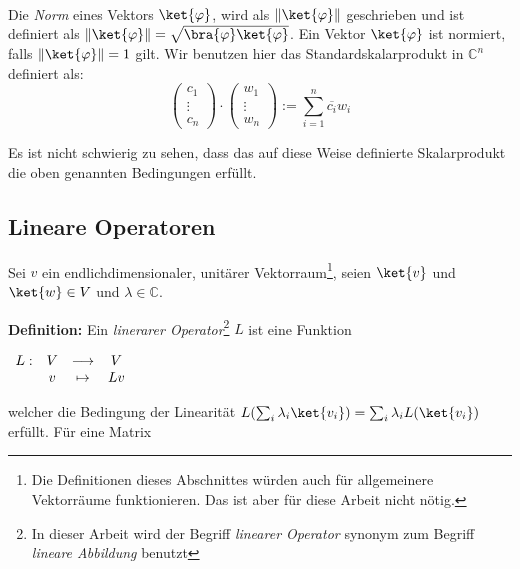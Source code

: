 \paragraph{}
Die \textit{Norm} eines Vektors $\ket{\varphi}$, wird als $\left\| \ket{\varphi} \right\|$ geschrieben und ist definiert als $\left\| \ket{\varphi} \right\| = \sqrt{\bra{\varphi}\ket{\varphi}}$. Ein Vektor $\ket{\varphi}$ ist normiert, falls $\left\| \ket{\varphi} \right\| = 1$ gilt. Wir benutzen hier das Standardskalarprodukt in $\mathbb{C}^n$ definiert als: $$\begin{pmatrix} c_1 \\ \vdots \\ c_n \end{pmatrix}\cdot\begin{pmatrix} w_1 \\ \vdots \\ w_n \end{pmatrix} := \sum_{i = 1}^{n}\overline{c_i}w_i$$

Es ist nicht schwierig zu sehen, dass das auf diese Weise definierte Skalarprodukt die oben genannten Bedingungen erfüllt.

\subsection{Lineare Operatoren}
Sei $v$ ein endlichdimensionaler, unitärer Vektorraum\footnote{Die Definitionen dieses Abschnittes würden auch für allgemeinere Vektorräume funktionieren. Das ist aber für diese Arbeit nicht nötig.}, seien $\ket{v}$ und $\ket{w} \in V$ und $\lambda \in \mathbb{C}$.

\textbf{Definition:} Ein \textit{linerarer Operator}\footnote{In dieser Arbeit wird der Begriff \textit{linearer Operator} synonym zum Begriff \textit{lineare Abbildung} benutzt} $L$ ist eine Funktion

\vspace{0.2cm}
\hspace{5cm}$\begin{array}{ l c c c}

L:  &  V & \longrightarrow & V \\
& v & \mapsto & Lv \\
\end{array}$
\vspace{0.2cm}

welcher die Bedingung der Linearität $L(\sum_i{\lambda_i\ket{v_i}}) = \sum_i{\lambda_iL(\ket{v_i})}$ erfüllt. Für eine Matrix

